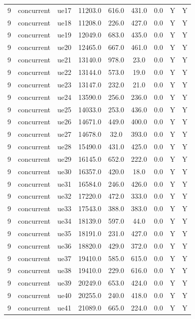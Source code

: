 \begin{table}[ht]
\begin{tabular}{|c|c|c|c|c|c|c|c|c|}
9 & concurrent & ue17 & 11203.0 & 616.0 & 431.0 & 0.0 & Y & Y \\
9 & concurrent & ue18 & 11208.0 & 226.0 & 427.0 & 0.0 & Y & Y \\
9 & concurrent & ue19 & 12049.0 & 683.0 & 435.0 & 0.0 & Y & Y \\
9 & concurrent & ue20 & 12465.0 & 667.0 & 461.0 & 0.0 & Y & Y \\
9 & concurrent & ue21 & 13140.0 & 978.0 & 23.0 & 0.0 & Y & Y \\
9 & concurrent & ue22 & 13144.0 & 573.0 & 19.0 & 0.0 & Y & Y \\
9 & concurrent & ue23 & 13147.0 & 232.0 & 21.0 & 0.0 & Y & Y \\
9 & concurrent & ue24 & 13590.0 & 256.0 & 236.0 & 0.0 & Y & Y \\
9 & concurrent & ue25 & 14033.0 & 253.0 & 436.0 & 0.0 & Y & Y \\
9 & concurrent & ue26 & 14671.0 & 449.0 & 400.0 & 0.0 & Y & Y \\
9 & concurrent & ue27 & 14678.0 & 32.0 & 393.0 & 0.0 & Y & Y \\
9 & concurrent & ue28 & 15490.0 & 431.0 & 425.0 & 0.0 & Y & Y \\
9 & concurrent & ue29 & 16145.0 & 652.0 & 222.0 & 0.0 & Y & Y \\
9 & concurrent & ue30 & 16357.0 & 420.0 & 18.0 & 0.0 & Y & Y \\
9 & concurrent & ue31 & 16584.0 & 246.0 & 426.0 & 0.0 & Y & Y \\
9 & concurrent & ue32 & 17220.0 & 472.0 & 333.0 & 0.0 & Y & Y \\
9 & concurrent & ue33 & 17543.0 & 388.0 & 383.0 & 0.0 & Y & Y \\
9 & concurrent & ue34 & 18139.0 & 597.0 & 44.0 & 0.0 & Y & Y \\
9 & concurrent & ue35 & 18191.0 & 231.0 & 427.0 & 0.0 & Y & Y \\
9 & concurrent & ue36 & 18820.0 & 429.0 & 372.0 & 0.0 & Y & Y \\
9 & concurrent & ue37 & 19410.0 & 585.0 & 615.0 & 0.0 & Y & Y \\
9 & concurrent & ue38 & 19410.0 & 229.0 & 616.0 & 0.0 & Y & Y \\
9 & concurrent & ue39 & 20249.0 & 653.0 & 424.0 & 0.0 & Y & Y \\
9 & concurrent & ue40 & 20255.0 & 240.0 & 418.0 & 0.0 & Y & Y \\
9 & concurrent & ue41 & 21089.0 & 665.0 & 224.0 & 0.0 & Y & Y \\

\end{tabular}
\end{table}
